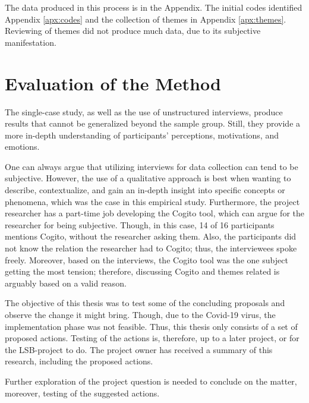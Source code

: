 The data produced in this process is in the Appendix. The initial codes identified Appendix \ref{apx:codes} and the collection of themes in Appendix \ref{apx:themes}.
Reviewing of themes did not produce much data, due to its subjective manifestation. 

\section{Evaluation of the Method}
The single-case study, as well as the use of unstructured interviews, produce results that cannot be generalized beyond the sample group. Still, they provide a more in-depth understanding of participants’ perceptions, motivations, and emotions. 

One can always argue that utilizing interviews for data collection can tend to be subjective. However, the use of a qualitative approach is best when wanting to describe, contextualize, and gain an in-depth insight into specific concepts or phenomena, which was the case in this empirical study. Furthermore, the project researcher has a part-time job developing the Cogito tool, which can argue for the researcher for being subjective. Though, in this case, 14 of 16 participants mentions Cogito, without the researcher asking them. Also, the participants did not know the relation the researcher had to Cogito; thus, the interviewees spoke freely. Moreover, based on the interviews, the Cogito tool was the one subject getting the most tension; therefore, discussing Cogito and themes related is arguably based on a valid reason. 

The objective of this thesis was to test some of the concluding proposals and observe the change it might bring. Though, due to the Covid-19 virus, the implementation phase was not feasible. Thus, this thesis only consists of a set of proposed actions. Testing of the actions is, therefore, up to a later project, or for the LSB-project to do. The project owner has received a summary of this research, including the proposed actions. 

Further exploration of the project question is needed to conclude on the matter, moreover, testing of the suggested actions.
\cleardoublepage